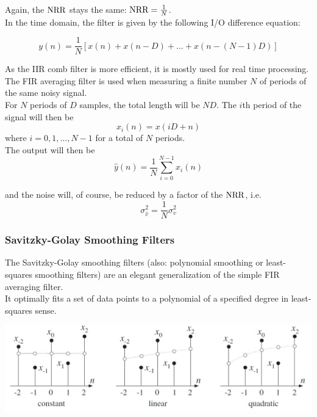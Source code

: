 Again, the $\operatorname{\text{NRR}}$ stays the same: $\operatorname{\text{NRR}} = \frac{1}{N}$. \\

In the time domain, the filter is given by the following I/O difference equation:

\begin{equation*}
	y(n) = \frac{1}{N} \left[ x(n)+x(n-D)+\ldots+x(n-(N-1)D) \right]
\end{equation*}

As the IIR comb filter is more efficient, it is mostly used for real time
processing. The FIR averaging filter is used when measuring a finite number
$N$ of periods of the same noisy signal. \\

For $N$ periods of $D$ samples, the total length will be $ND$. The $i$th period
of the signal will then be
\begin{equation*}
	x_i(n) = x(iD+n)
\end{equation*}
where $i=0,1,\ldots,N-1$ for a total of $N$ periods. \\

The output will then be
\begin{equation*}
	\hat{y}(n)=\frac{1}{N}\sum_{i=0}^{N-1}x_i(n)
\end{equation*}

and the noise will, of course, be reduced by a factor of the $\operatorname{\text{NRR}}$, i.e.
\begin{equation*}
	\sigma_{\hat{v}}^2 = \frac{1}{N} \sigma_v^2
\end{equation*}


\subsubsection{Savitzky-Golay Smoothing Filters}

The Savitzky-Golay smoothing filters (also: polynomial smoothing or
least-squares smoothing filters) are an elegant generalization of the
simple FIR averaging filter. \\

It optimally fits a set of data points to a polynomial of a specified
degree in least-squares sense.

\begin{center}
	\includegraphics[width=\linewidth]{images/SignProcApp_SavitzkyGolay.jpg}
\end{center}

